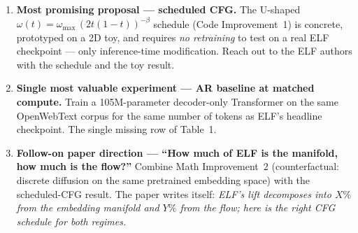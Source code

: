 \documentclass[11pt]{article}
\begin{document}
\begin{enumerate}
  \item \textbf{Most promising proposal --- scheduled CFG.} The U-shaped $\omega(t) = \omega_{\max}\,(2t(1-t))^{-\beta}$ schedule (Code Improvement~1) is concrete, prototyped on a 2D toy, and requires \emph{no retraining} to test on a real ELF checkpoint --- only inference-time modification. Reach out to the ELF authors with the schedule and the toy result.
  \item \textbf{Single most valuable experiment --- AR baseline at matched compute.} Train a 105M-parameter decoder-only Transformer on the same OpenWebText corpus for the same number of tokens as ELF's headline checkpoint. The single missing row of Table~1.
  \item \textbf{Follow-on paper direction --- ``How much of ELF is the manifold, how much is the flow?''} Combine Math Improvement~2 (counterfactual: discrete diffusion on the same pretrained embedding space) with the scheduled-CFG result. The paper writes itself: \emph{ELF's lift decomposes into $X\%$ from the embedding manifold and $Y\%$ from the flow; here is the right CFG schedule for both regimes.}
\end{enumerate}
\end{document}
